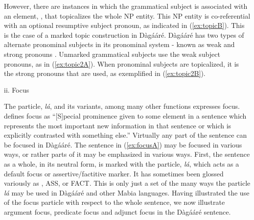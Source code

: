 \begin{refsection}
However, there are instances in which the grammatical subject is associated with an element,
\textsc{{\TOP}}, that topicalizes the whole NP entity. This NP entity is co-referential with an optional
resumptive subject pronoun, as indicated in (\ref{ex:topicB}). This is the case of a marked topic
construction in Dàgááré. Dàgááré has two types of alternate pronominal subjects in its
pronominal system - known as weak and strong pronouns \citet{Bodomo1997}. Unmarked
grammatical subjects use the weak subject pronouns, as in (\ref{ex:topic2A}). When pronominal subjects
are topicalized, it is the strong pronouns that are used, as exemplified in (\ref{ex:topic2B}).\bigskip

\noindent ii. Focus

The particle, \textit{lá}, and its variants, among many other functions expresses focus. \citet[105]{Trask1993} defines focus as ``[S]pecial prominence given to some element in a sentence
which represents the most important new information in that sentence or which is explicitly
contrasted with something else.'' Virtually any part of the sentence can be focused in
Dàgááré. The sentence in (\ref{ex:focusA}) may be focused in various ways, or rather parts of it may be
emphasized in various ways. First, the sentence as a whole, in its neutral form, is marked with
the particle, \textit{lá}, which acts as a default focus or assertive/factitive marker. It has sometimes
been glossed variously as \textsc{{\FOC}}, \textsc{ASS}, or \textsc{FACT}. This is only just a set of the many ways the
particle \textit{lá} may be used in Dàgááré
\citep{Bodomo1997, Bodomo1997Pathfinders,  Dakubu1998} and
other Mabia languages. Having illustrated the use of the focus particle with respect to the
whole sentence, we now illustrate argument focus, predicate focus and adjunct focus in the
Dàgááré sentence.




\end{refsection}
